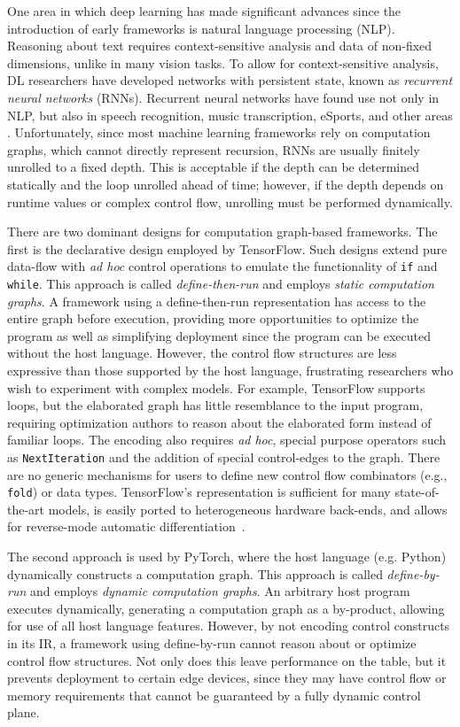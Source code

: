 One area in which deep learning has made significant advances since
  the introduction of early frameworks is natural language processing (NLP).
Reasoning about text requires context-sensitive analysis and data of
    non-fixed dimensions, unlike in many vision tasks.
 To allow for context-sensitive analysis, DL researchers have developed networks with persistent
  state, known as \textit{recurrent neural networks}  (RNNs).
Recurrent neural networks have found use not only in NLP, but also in speech recognition, music
  transcription, eSports, and other areas \citep{lstm, speech_recognition, OpenAI_dota}.
Unfortunately, since most machine learning frameworks rely on computation graphs,
  which cannot directly represent recursion, RNNs are usually finitely unrolled to a fixed depth.
This is acceptable if the depth can be determined statically and the loop unrolled
  ahead of time; however, if the depth depends on runtime values or complex control flow,
  unrolling must be performed dynamically.

There are two dominant designs for computation graph-based frameworks.
The first is the declarative design employed by TensorFlow.
Such designs extend pure data-flow with \textit{ad hoc} control operations
  to emulate the functionality of \verb|if| and \verb|while|.
This approach is called \textit{define-then-run} and employs \textit{static
computation graphs}.
A framework using a define-then-run representation has access to the entire
  graph before execution, providing more opportunities to optimize the program
  as well as simplifying deployment since the program can be executed
  without the host language.
However, the control flow structures are less expressive than those supported
  by the host language, frustrating researchers who wish to experiment with complex models.
For example, TensorFlow supports loops,
  but the elaborated graph has little resemblance to the input program, requiring optimization
  authors to reason about the elaborated form instead of familiar loops.
The encoding also requires \textit{ad hoc}, special purpose operators such
  as \verb|NextIteration| and the addition of special control-edges to the graph.
There are no generic mechanisms for users to define new control flow
  combinators (e.g., \verb|fold|) or data types.
TensorFlow's representation is sufficient for many state-of-the-art models,
  is easily ported to heterogeneous hardware back-ends,
  and allows for reverse-mode automatic differentiation~{\citep{ad_survey, tensorflow}}.

The second approach is used by PyTorch, where the host language (e.g. Python) dynamically
  constructs a computation graph.
This approach is called \textit{define-by-run} and employs \textit{dynamic computation graphs}.
An arbitrary host program executes dynamically, generating a computation graph as a by-product,
  allowing for use of all host language features.
However, by not encoding control constructs in its IR, a framework
  using define-by-run cannot reason about or optimize control flow structures.
Not only does this leave performance on the table, but it prevents deployment to certain
  edge devices, since they may have control flow or memory requirements that cannot be
  guaranteed by a fully dynamic control plane.

